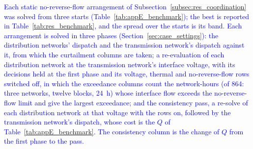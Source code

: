 \textcolor{blue}{
    Each static no-reverse-flow arrangement of Subsection~\ref{subsec:res_coordination} was solved from three starts (Table~\ref{tab:appE_benchmark}); the best is reported in Table~\ref{tab:res_benchmark}, and the spread over the starts is its band. Each arrangement is solved in three phases (Section~\ref{sec:case_settings}): the distribution networks' dispatch and the transmission network's dispatch against it, from which the curtailment columns are taken; a re-evaluation of each distribution network at the transmission network's interface voltage, with its decisions held at the first phase and its voltage, thermal and no-reverse-flow rows switched off, in which the exceedance columns count the network-hours (of 864: three networks, twelve blocks, 24~h) whose interface flow exceeds the no-reverse-flow limit and give the largest exceedance; and the consistency pass, a re-solve of each distribution network at that voltage with the rows on, followed by the transmission network's dispatch, whose cost is the $Q$ of Table~\ref{tab:appE_benchmark}. The consistency column is the change of $Q$ from the first phase to the pass.
}

